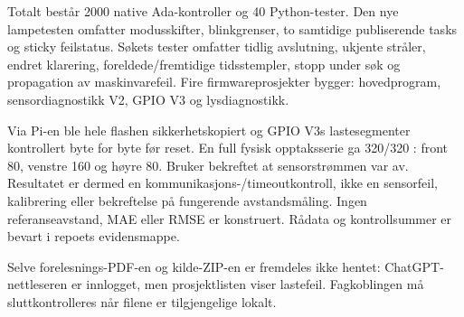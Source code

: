 Totalt består 2000 native Ada-kontroller og 40 Python-tester. Den nye
lampetesten omfatter modusskifter, blinkgrenser, to samtidige publiserende
tasks og sticky feilstatus. Søkets tester omfatter tidlig avslutning,
ukjente stråler, endret klarering, foreldede/fremtidige tidsstempler,
stopp under søk og propagation av maskinvarefeil. Fire firmwareprosjekter
bygger: hovedprogram, sensordiagnostikk V2, GPIO V3 og lysdiagnostikk.

Via Pi-en ble hele flashen sikkerhetskopiert og GPIO V3s lastesegmenter
kontrollert byte for byte før reset. En full fysisk opptaksserie ga
320/320 : front 80, venstre 160 og høyre 80.
Bruker bekreftet at sensorstrømmen var av. Resultatet er dermed en
kommunikasjons-/timeoutkontroll, ikke en sensorfeil, kalibrering eller
bekreftelse på fungerende avstandsmåling. Ingen referanseavstand, MAE eller
RMSE er konstruert. Rådata og kontrollsummer er bevart i repoets evidensmappe.


Selve forelesnings-PDF-en og kilde-ZIP-en er fremdeles ikke hentet:
ChatGPT-nettleseren er innlogget, men prosjektlisten viser lastefeil.
Fagkoblingen må sluttkontrolleres når filene er tilgjengelige lokalt.
